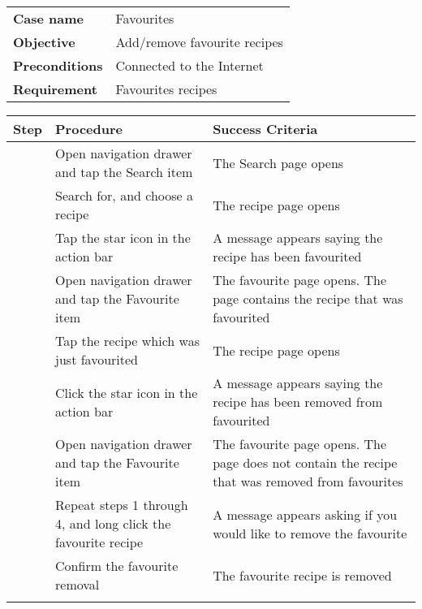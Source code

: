 \documentclass[a4paper,12pt]{report}
\newcommand{\testcase}[4]
{
\begin{center}
\begin{tabular}{p{2.6cm} p{10cm}}
\hline
\textbf{Case name} & #1\\
\textbf{Objective} & #2\\
\textbf{Preconditions} & #3\\
\textbf{Requirement} & #4\\
\hline
\end{tabular}
\end{center}
}
\newcounter{counter}
\newenvironment{testprocedure}%
{\newcommand{\step}{\arabic{counter}\stepcounter{counter}}
\setcounter{counter}{1}
\begin{center}
\begin{tabular}{| c | p{5.4cm} | p{5.4cm} |}
\hline
\textbf{Step} & \textbf{Procedure} & \textbf{Success Criteria}\\
\hline}
{\hline
\multicolumn{3}{c}{} \\%
\end{tabular}
\end{center}}
\begin{document}
\testcase
{Favourites}
{Add/remove favourite recipes}
{Connected to the Internet}
{Favourites recipes}

\begin{testprocedure}
\step & Open navigation drawer and tap the Search item & The Search page opens\\
\hline
\step & Search for, and choose a recipe & The recipe page opens\\
\hline
\step & Tap the star icon in the action bar & A message appears saying the recipe has been favourited\\
\hline
\step & Open navigation drawer and tap the Favourite item & The favourite page opens. The page contains the recipe that was favourited\\
\hline
\step & Tap the recipe which was just favourited & The recipe page opens\\
\hline
\step & Click the star icon in the action bar & A message appears saying the recipe has been removed from favourited\\
\hline
\step & Open navigation drawer and tap the Favourite item & The favourite page opens. The page does not contain the recipe that was removed from favourites\\
\hline
\step & Repeat steps 1 through 4, and long click the favourite recipe & A message appears asking if you would like to remove the favourite\\
\hline
\step & Confirm the favourite removal & The favourite recipe is removed\\
\end{testprocedure}
\end{document}
